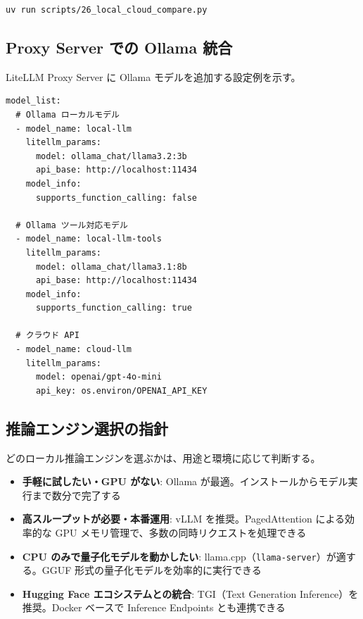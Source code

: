 \documentclass[a4paper,11pt]{ltjsarticle}
\newcommand{\code}[1]{\texttt{#1}}
\begin{document}
\begin{lstlisting}[style=bash]
uv run scripts/26_local_cloud_compare.py
\end{lstlisting}

\subsection{Proxy Server での Ollama 統合}

LiteLLM Proxy Server に Ollama モデルを追加する設定例を示す。

\begin{lstlisting}[style=python, caption={Ollama を含む Proxy Server 設定（\code{config.yaml}）}]
model_list:
  # Ollama ローカルモデル
  - model_name: local-llm
    litellm_params:
      model: ollama_chat/llama3.2:3b
      api_base: http://localhost:11434
    model_info:
      supports_function_calling: false

  # Ollama ツール対応モデル
  - model_name: local-llm-tools
    litellm_params:
      model: ollama_chat/llama3.1:8b
      api_base: http://localhost:11434
    model_info:
      supports_function_calling: true

  # クラウド API
  - model_name: cloud-llm
    litellm_params:
      model: openai/gpt-4o-mini
      api_key: os.environ/OPENAI_API_KEY
\end{lstlisting}

\subsection{推論エンジン選択の指針}

どのローカル推論エンジンを選ぶかは、用途と環境に応じて判断する。

\begin{itemize}
  \item \textbf{手軽に試したい・GPU がない}: Ollama が最適。インストールからモデル実行まで数分で完了する
  \item \textbf{高スループットが必要・本番運用}: vLLM を推奨。PagedAttention による効率的な GPU メモリ管理で、多数の同時リクエストを処理できる
  \item \textbf{CPU のみで量子化モデルを動かしたい}: llama.cpp（\code{llama-server}）が適する。GGUF 形式の量子化モデルを効率的に実行できる
  \item \textbf{Hugging Face エコシステムとの統合}: TGI（Text Generation Inference）を推奨。Docker ベースで Inference Endpoints とも連携できる
\end{itemize}
\end{document}
